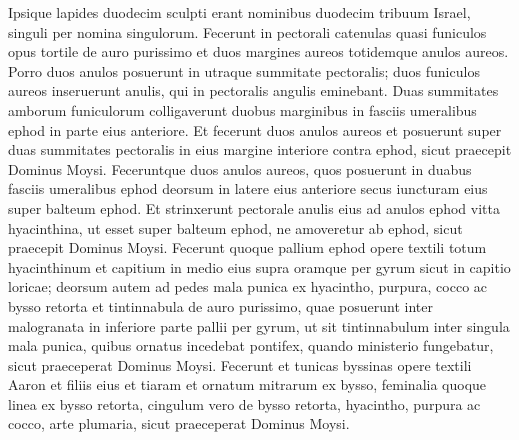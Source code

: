 \begin{biblechapter}
\begin{biblechapter}
\begin{biblechapter}
\begin{biblechapter}
\begin{biblechapter}
\begin{biblechapter}
\begin{biblechapter}
\begin{biblechapter}
\begin{biblechapter}
\begin{biblechapter}
\begin{biblechapter}
\begin{biblechapter}
\begin{biblechapter}
\begin{biblechapter}
\begin{biblechapter}
\begin{biblechapter}
\begin{biblechapter}
\begin{biblechapter}
\begin{biblechapter}
\begin{biblechapter}
\begin{biblechapter}
\begin{biblechapter}
\begin{biblechapter}
\begin{biblechapter}
\begin{biblechapter}
\begin{biblechapter}
\begin{biblechapter}
\begin{biblechapter}
\begin{biblechapter}
\begin{biblechapter}
\begin{biblechapter}
\begin{biblechapter}
\begin{biblechapter}
\begin{biblechapter}
\begin{biblechapter}
\begin{biblechapter}
\begin{biblechapter}
\begin{biblechapter}
\begin{biblechapter}
\verse Ipsique lapides duodecim sculpti erant nominibus duodecim tribuum Israel, singuli per nomina singulorum. 
\verse Fecerunt in pectorali catenulas quasi funiculos opus tortile de auro purissimo 
\verse et duos margines aureos totidemque anulos aureos. Porro duos anulos posuerunt in utraque summitate pectoralis; 
\verse duos funiculos aureos inseruerunt anulis, qui in pectoralis angulis eminebant. 
\verse Duas summitates amborum funiculorum colligaverunt duobus marginibus in fasciis umeralibus ephod in parte eius anteriore. 
\verse Et fecerunt duos anulos aureos et posuerunt super duas summitates pectoralis in eius margine interiore contra ephod, sicut praecepit Dominus Moysi.
 \verse Feceruntque duos anulos aureos, quos posuerunt in duabus fasciis umeralibus ephod deorsum in latere eius anteriore secus iuncturam eius super balteum ephod. 
\verse Et strinxerunt pectorale anulis eius ad anulos ephod vitta hyacinthina, ut esset super balteum ephod, ne amoveretur ab ephod, sicut praecepit Dominus Moysi.
 \verse Fecerunt quoque pallium ephod opere textili totum hyacinthinum 
\verse et capitium in medio eius supra oramque per gyrum sicut in capitio loricae; 
\verse deorsum autem ad pedes mala punica ex hyacintho, purpura, cocco ac bysso retorta 
 \verse et tintinnabula de auro purissimo, quae posuerunt inter malogranata in inferiore parte pallii per gyrum, 
\verse ut sit tintinnabulum inter singula mala punica, quibus ornatus incedebat pontifex, quando ministerio fungebatur, sicut praeceperat Dominus Moysi.
 \verse Fecerunt et tunicas byssinas opere textili Aaron et filiis eius 
\verse et tiaram et ornatum mitrarum ex bysso, feminalia quoque linea ex bysso retorta, 
 \verse cingulum vero de bysso retorta, hyacintho, purpura ac cocco, arte plumaria, sicut praeceperat Dominus Moysi.

\end{biblechapter}
\end{biblechapter}
\end{biblechapter}
\end{biblechapter}
\end{biblechapter}
\end{biblechapter}
\end{biblechapter}
\end{biblechapter}
\end{biblechapter}
\end{biblechapter}
\end{biblechapter}
\end{biblechapter}
\end{biblechapter}
\end{biblechapter}
\end{biblechapter}
\end{biblechapter}
\end{biblechapter}
\end{biblechapter}
\end{biblechapter}
\end{biblechapter}
\end{biblechapter}
\end{biblechapter}
\end{biblechapter}
\end{biblechapter}
\end{biblechapter}
\end{biblechapter}
\end{biblechapter}
\end{biblechapter}
\end{biblechapter}
\end{biblechapter}
\end{biblechapter}
\end{biblechapter}
\end{biblechapter}
\end{biblechapter}
\end{biblechapter}
\end{biblechapter}
\end{biblechapter}
\end{biblechapter}
\end{biblechapter}
